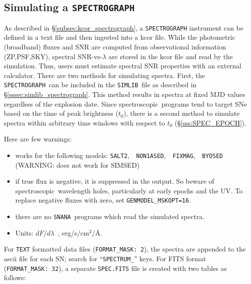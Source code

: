 \documentclass[12pt]{article}
\newcommand{\SPEC}{{\tt SPECTROGRAPH}}
\newcommand{\Flam}{dF/d\lambda}
\newcommand{\snana}{{\tt SNANA}}
\newcommand{\simlib}{{\tt SIMLIB}}
\newcommand{\spec}{spectroscopic}
\begin{document}
  \clearpage
   \subsection{Simulating a {\SPEC} }
   \label{subsec:sim_spec}

As described in \S\ref{subsec:kcor_spectrograph}, 
a {\SPEC} instrument can be defined in a text file
and then ingested into a kcor file.
While the photometric (broadband) fluxes and SNR are computed 
from observational information (ZP,PSF,SKY), 
spectral SNR-vs-$\lambda$ are stored in the kcor file and 
read by the simulation.
Thus, users must estimate spectral SNR properties with an 
external calculator. There are two methods for simulating spectra.
First, the \SPEC\ can be included in the \simlib\ file
as described in \S\ref{sssec:simlib_spectrograph}.
This method results in spectra at fixed MJD values
regardless of the explosion date. Since \spec\ programs
tend to target SNe based on the time of peak brightness ($t_0$),
there is a second method to simulate spectra within arbitrary 
time windows with respect to $t_0$ (\S\ref{sss:SPEC_EPOCH}).


\medskip
Here are few warnings:
\begin{itemize}
  \item works for the following models: 
       {\tt SALT2},~~{\tt NON1ASED},~~{\tt FIXMAG},~~{\tt BYOSED} \\
         (WARNING: does not work for SIMSED)
  \item if true flux is negative, it is suppressed in the output. 
        So beware of \spec\ wavelength holes, 
        particularly at early epochs and the UV.
        To replace negative fluxes with zero, set {\tt GENMODEL\_MSKOPT=16}.
%
  \item there are no \snana\ programs which read the simulated spectra.
  \item Units: $\Flam$~, erg/s/cm$^2$/\AA.
\end{itemize}

\medskip
For {\tt TEXT} formatted data files ({\tt FORMAT\_MASK: 2}),
the spectra are appended to the ascii file for each SN; 
search for ``{\tt SPECTRUM\_}'' keys.
For FITS format ({\tt FORMAT\_MASK: 32}), 
a separate {\tt *SPEC.FITS} file is created
with two tables as follows:
\end{document}
